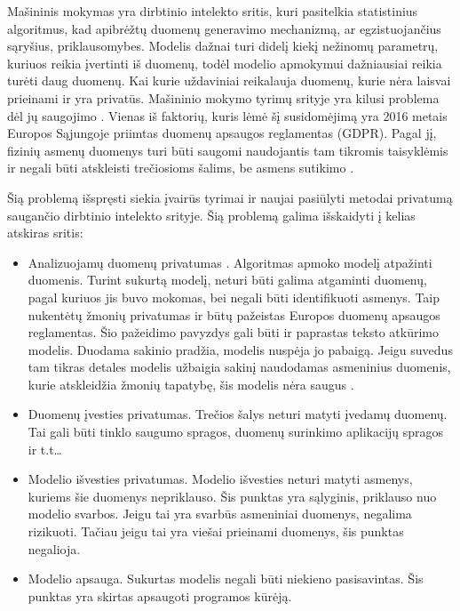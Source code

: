\documentclass{VUMIFInfBakalaurinis}
\begin{document}

	\par Mašininis mokymas yra dirbtinio intelekto sritis, kuri pasitelkia statistinius algoritmus, kad apibrėžtų duomenų generavimo mechanizmą, ar egzistuojančius sąryšius, priklausomybes. Modelis dažnai turi didelį kiekį nežinomų parametrų, kuriuos reikia įvertinti iš duomenų, todėl modelio apmokymui dažniausiai reikia turėti daug duomenų. Kai kurie uždaviniai reikalauja duomenų, kurie nėra laisvai prieinami ir yra privatūs. Mašininio mokymo tyrimų srityje yra kilusi problema dėl jų saugojimo \cite{10}. Vienas iš faktorių, kuris lėmė šį susidomėjimą yra 2016 metais Europos Sąjungoje priimtas duomenų apsaugos reglamentas (GDPR). Pagal jį, fizinių asmenų duomenys turi būti saugomi naudojantis tam tikromis taisyklėmis ir negali būti atskleisti trečiosioms šalims, be asmens sutikimo \cite{1}.
	\par Šią problemą išspręsti siekia įvairūs tyrimai ir naujai pasiūlyti metodai privatumą saugančio dirbtinio intelekto srityje. Šią problemą galima išskaidyti į kelias atskiras sritis:
\begin{itemize}
    \item Analizuojamų duomenų privatumas \cite{2}. Algoritmas apmoko modelį atpažinti duomenis. Turint sukurtą modelį, neturi būti galima atgaminti duomenų, pagal kuriuos jis buvo mokomas, bei negali būti identifikuoti asmenys. Taip nukentėtų žmonių privatumas ir būtų pažeistas Europos duomenų apsaugos reglamentas. Šio pažeidimo pavyzdys gali būti ir paprastas teksto atkūrimo modelis. Duodama sakinio pradžia, modelis nuspėja jo pabaigą. Jeigu suvedus tam tikras detales modelis užbaigia sakinį naudodamas asmeninius duomenis, kurie atskleidžia žmonių tapatybę, šis modelis nėra saugus \cite{12}.
    \item Duomenų įvesties privatumas. Trečios šalys neturi matyti įvedamų duomenų. Tai gali būti tinklo saugumo spragos, duomenų surinkimo aplikacijų spragos ir t.t…
    \item Modelio išvesties privatumas. Modelio išvesties neturi matyti asmenys, kuriems šie duomenys nepriklauso. Šis punktas yra sąlyginis, priklauso nuo modelio svarbos. Jeigu tai yra svarbūs asmeniniai duomenys, negalima rizikuoti. Tačiau jeigu tai yra viešai prieinami duomenys, šis punktas negalioja.
    \item Modelio apsauga. Sukurtas modelis negali būti niekieno pasisavintas. Šis punktas yra skirtas apsaugoti programos kūrėją.
\end{itemize}
\end{document}
